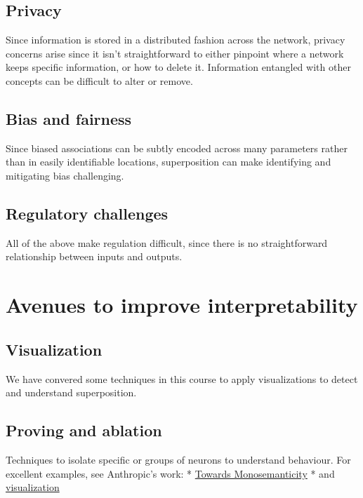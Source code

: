 \documentclass[
  letterpaper,
  DIV=11,
  numbers=noendperiod]{scrreprt}
\begin{document}
\subsection{Privacy}\label{privacy}

Since information is stored in a distributed fashion across the network,
privacy concerns arise since it isn't straightforward to either pinpoint
where a network keeps specific information, or how to delete it.
Information entangled with other concepts can be difficult to alter or
remove.

\subsection{Bias and fairness}\label{bias-and-fairness}

Since biased associations can be subtly encoded across many parameters
rather than in easily identifiable locations, superposition can make
identifying and mitigating bias challenging.

\subsection{Regulatory challenges}\label{regulatory-challenges}

All of the above make regulation difficult, since there is no
straightforward relationship between inputs and outputs.

\section{Avenues to improve
interpretability}\label{avenues-to-improve-interpretability}

\subsection{Visualization}\label{visualization}

We have convered some techniques in this course to apply visualizations
to detect and understand superposition.

\subsection{Proving and ablation}\label{proving-and-ablation}

Techniques to isolate specific or groups of neurons to understand
behaviour. For excellent examples, see Anthropic's work: *
\href{https://transformer-circuits.pub/2023/monosemantic-features/index.html}{Towards
Monosemanticity} * and
\href{https://transformer-circuits.pub/2023/monosemantic-features/vis/a1.html}{visualization}
\end{document}

